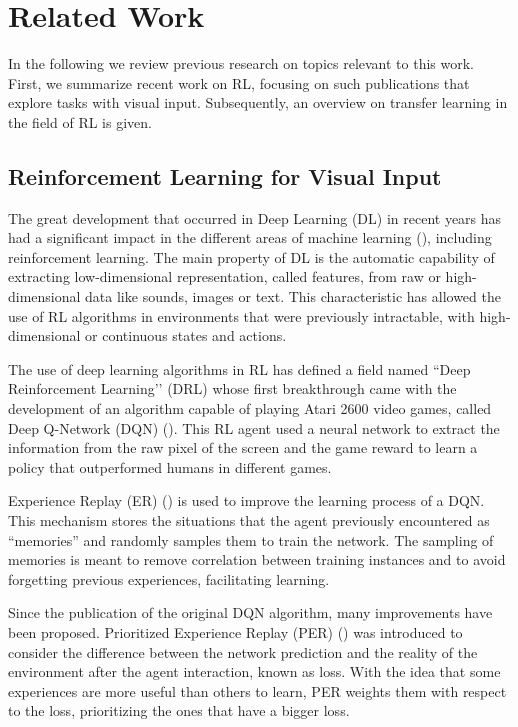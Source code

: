 \section{Related Work}
\label{sec:related-work}

In the following we review previous research on topics relevant to this work. First, we summarize recent work on RL, focusing on such publications that explore tasks with visual input. Subsequently, an overview on transfer learning in the field of RL is given. 

\subsection{Reinforcement Learning for Visual Input}
The great development that occurred in Deep Learning (DL) in recent years has had a significant impact in the different areas of machine learning (\citet{deep_learning_development}), including reinforcement learning. The main property of DL is the automatic capability of extracting low-dimensional representation, called features, from raw or high-dimensional data like sounds, images or text. This characteristic has allowed the use of RL algorithms in environments that were previously intractable, with high-dimensional or continuous states and actions.

The use of deep learning algorithms in RL has defined a field named ``Deep Reinforcement Learning’’ (DRL) whose first breakthrough came with the development of an algorithm capable of playing Atari 2600 video games, called Deep Q-Network (DQN) (\citet{DQN}). This RL agent used a neural network to extract the information from the raw pixel of the screen and the game reward to learn a policy that outperformed humans in different games.

Experience Replay (ER) (\citet{replay_memory_oc}) is used to improve the learning process of a DQN. This mechanism stores the situations that the agent previously encountered as ``memories'' and randomly samples them to train the network. The sampling of memories is meant to remove correlation between training instances and to avoid forgetting previous experiences, facilitating learning.

Since the publication of the original DQN algorithm, many improvements have been proposed. Prioritized Experience Replay (PER) (\citet{prioritized_memory}) was introduced to consider the difference between the network prediction and the reality of the environment after the agent interaction, known as loss. With the idea that some experiences are more useful than others to learn, PER weights them with respect to the loss, prioritizing the ones that have a bigger loss.

